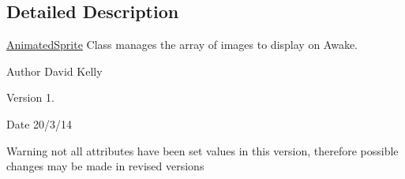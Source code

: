 \subsection{Detailed Description}
\hyperlink{class_animated_sprite}{Animated\-Sprite} Class manages the array of images to display on Awake. 

\begin{DoxyAuthor}{Author}
David Kelly 
\end{DoxyAuthor}
\begin{DoxyVersion}{Version}
1. 
\end{DoxyVersion}
\begin{DoxyDate}{Date}
20/3/14
\end{DoxyDate}
\begin{DoxyWarning}{Warning}
not all attributes have been set values in this version, therefore possible changes may be made in revised versions 
\end{DoxyWarning}



